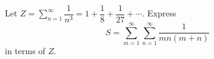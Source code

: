 Let $Z=\displaystyle\sum_{n=1}^{\infty}\dfrac{1}{n^3}=1+\dfrac18+\dfrac1{27}+\cdots$. Express
\[S=\sum_{m=1}^{\infty}\sum_{n=1}^{\infty}\dfrac{1}{mn(m+n)}\]
in terms of $Z$.
